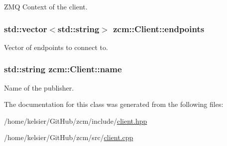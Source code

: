 Z\-M\-Q Context of the client. 

\hypertarget{classzcm_1_1Client_a01cfee292bb3546a47ec70fff35ff1b6}{
\subsubsection[{endpoints}]{\setlength{\rightskip}{0pt plus 5cm}std\-::vector$<$std\-::string$>$ zcm\-::\-Client\-::endpoints\hspace{0.3cm}{\ttfamily [private]}}}\label{classzcm_1_1Client_a01cfee292bb3546a47ec70fff35ff1b6}


Vector of endpoints to connect to. 

\hypertarget{classzcm_1_1Client_ae972b951134774fd2246d802e2bc6fc0}{
\subsubsection[{name}]{\setlength{\rightskip}{0pt plus 5cm}std\-::string zcm\-::\-Client\-::name\hspace{0.3cm}{\ttfamily [private]}}}\label{classzcm_1_1Client_ae972b951134774fd2246d802e2bc6fc0}


Name of the publisher. 



The documentation for this class was generated from the following files\-:\begin{DoxyCompactItemize}
\item 
/home/kelsier/\-Git\-Hub/zcm/include/\hyperlink{client_8hpp}{client.\-hpp}\item 
/home/kelsier/\-Git\-Hub/zcm/src/\hyperlink{client_8cpp}{client.\-cpp}\end{DoxyCompactItemize}
